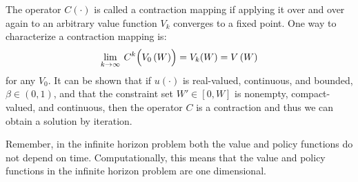 The operator $C(\cdot)$ is called a contraction mapping if applying it over and over again to an arbitrary value function $V_k$ converges to a fixed point. One way to characterize a contraction mapping is:
\begin{equation*}
\lim_{k\rightarrow\infty}\: C^k\Bigl(V_0\left(W\right)\Bigr) = V_k(W) =  V\left(W\right)
\end{equation*}
for any $V_0$.  It can be shown that if $u(\cdot)$ is real-valued, continuous, and bounded, $\beta\in(0,1)$, and that the constraint set $W'\in[0,W]$ is nonempty, compact-valued, and continuous, then the operator $C$ is a contraction and thus we can obtain a solution by iteration.

Remember, in the infinite horizon problem both the value and policy functions do not depend on time.  Computationally, this means that the value and policy functions in the infinite horizon problem are one dimensional.

